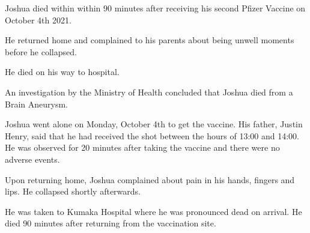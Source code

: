 Joshua died within within 90 minutes after receiving his second Pfizer Vaccine
on October 4th 2021.

He returned home and complained to his parents about being unwell moments before
he collapsed.

He died on his way to hospital.

An investigation by the Ministry of Health concluded that Joshua died from a
Brain Aneurysm.

Joshua went alone on Monday, October 4th to get the vaccine. His father, Justin
Henry, said that he had received the shot between the hours of 13:00 and
14:00. He was observed for 20 minutes after taking the vaccine and there were no
adverse events.

Upon returning home, Joshua complained about pain in his hands, fingers and
lips. He collapsed shortly afterwards.

He was taken to Kumaka Hospital where he was pronounced dead on arrival. He died
90 minutes after returning from the vaccination site.

